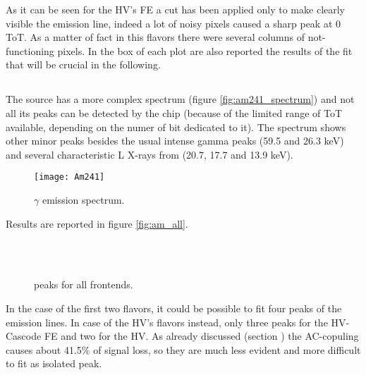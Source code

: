 As it can be seen for the HV's FE a cut has been applied only to make clearly visible the emission line, indeed a lot of noisy pixels caused a sharp peak at 0 ToT. As a matter of fact in this flavors there were several columns of not-functioning pixels. In the box of each plot are also reported the results of the fit that will be crucial in the following.


\subsection{}


The  source has a more complex spectrum (figure \vref{fig:am241_spectrum}) and not all its peaks can be detected by the chip (because of the limited range of ToT available, depending on the numer of bit dedicated to it). The spectrum shows other minor peaks besides the usual intense gamma peaks (59.5 and 26.3 keV) and several characteristic L X-rays from  (20.7, 17.7 and 13.9 keV).\\ 

\begin{figure}[h!]
\centering
\texttt{[image: Am241]}
\caption{ $\gamma$ emission spectrum.}
\label{fig:am241_spectrum}
\end{figure}

Results are reported in figure \vref{fig:am_all}. 

\begin{figure}[h!]
\centering
{}\quad
{}\\
\quad
{}\\
\caption{ peaks for all frontends.}
\label{fig:am_all}
\end{figure}

In the case of the first two flavors, it could be possible to fit four peaks of the emission lines. In case of the HV's flavors instead, only three peaks for the HV-Cascode FE and two for the HV. As already discussed (section ) the AC-copuling causes about 41.5\% of signal loss, so they are much less evident and more difficult to fit as isolated peak.



